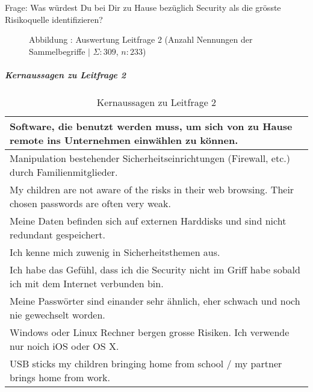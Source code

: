 \documentclass[../../main.tex]{subfiles}
\begin{document}
\begin{sloppypar}
Frage: Was würdest Du bei Dir zu Hause bezüglich Security als die grösste Risikoquelle identifizieren?
\end{sloppypar}

\addtocounter{figure}{1}\begin{figure}[H]
    
    \vspace*{-5mm}
    \caption*{Abbildung \thefigure: Auswertung Leitfrage 2 (Anzahl Nennungen der Sammelbegriffe $\vert$ $\Sigma: 309$, $n: 233$)}
    \label{pgfplot_leitfrage2}
\end{figure}

\subparagraph*{Kernaussagen zu Leitfrage 2}\mbox{}


\begin{table}[H]
\tablefontsize	
\caption{Kernaussagen zu Leitfrage 2}
\label{kernaussagen_leitfrage2}


\begin{tabular}{ |p{\textwidth-1cm}| }



\hline
[\dots]Software, die benutzt werden muss, um sich von zu Hause remote ins Unternehmen einwählen zu können.\\ 
\hline
Manipulation bestehender Sicherheitseinrichtungen (Firewall, etc.) durch Familienmitglieder.\\
\hline
My children are not aware of the risks in their web browsing. Their chosen passwords are often very weak. \\ 
\hline
Meine Daten befinden sich auf externen Harddisks und sind nicht redundant gespeichert. \\ 
\hline
Ich kenne mich zuwenig in Sicherheitsthemen aus.\\ 
\hline
Ich habe das Gefühl, dass ich die Security nicht im Griff habe sobald ich mit dem Internet verbunden bin. \\ 
\hline
Meine Passwörter sind einander sehr ähnlich, eher schwach und noch nie gewechselt worden. \\ 
\hline
Windows oder Linux  Rechner bergen grosse Risiken. Ich verwende nur noich iOS oder OS X. \\ 
\hline
USB sticks my children bringing home from school / my partner brings home from work. \\ 
\hline

\end{tabular}
\end{table}
\end{document}
